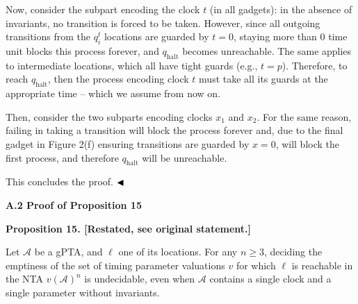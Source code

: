 \documentclass[10pt,a4paper]{article}
\begin{document}
 
 
Now, consider the subpart encoding the clock $t$ (in all gadgets): in the absence of invariants, no transition is forced to be taken. However, since all outgoing transitions from the $q_{i}^{t}$ locations are guarded by $t=0$, staying more than 0 time unit blocks this process forever, and $q_{\textrm{halt}}$ becomes unreachable. The same applies to intermediate locations, which all have tight guards (e.g., $t=p$). Therefore, to reach $q_{\textrm{halt}}$, then the process encoding clock $t$ must take all its guards at the appropriate time -- which we assume from now on.\par
 
 
 
Then, consider the two subparts encoding clocks $x_{1}$ and $x_{2}$. For the same reason, failing in taking a transition will block the process forever and, due to the final gadget in Figure 2(f) ensuring transitions are guarded by $x=0$, will block the first process, and therefore $q_{\textrm{halt}}$ will be unreachable.\par
 
 
 
This concludes the proof. $\hfill\blacktriangleleft$\par
 
 
 
 
 
\par\medskip\noindent\textbf{A.2 Proof of Proposition 15}\par
 
 
 
\par\medskip\noindent\textbf{Proposition 15. [Restated, see original statement.]}\par
 
 
Let $\mathcal{A}$ be a gPTA, and $\mathrm{\ell}$ one of its locations. For any $n\geq 3$, deciding the emptiness of the set of timing parameter valuations $v$ for which $\mathrm{\ell}$ is reachable in the NTA ${v(\mathcal{A})}^{n}$ is undecidable, even when $\mathcal{A}$ contains a single clock and a single parameter without invariants.\par
 
\end{document}
